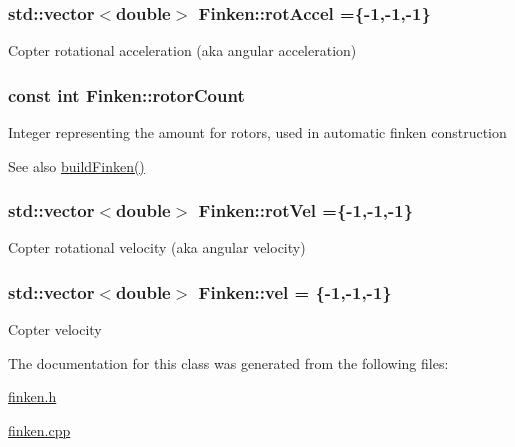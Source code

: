 \subsubsection[{\texorpdfstring{rot\+Accel}{rotAccel}}]{\setlength{\rightskip}{0pt plus 5cm}std\+::vector$<$double$>$ Finken\+::rot\+Accel =\{-\/1,-\/1,-\/1\}}\hypertarget{classFinken_ab1b738a1b691879be240b1b9488f7009}{}\label{classFinken_ab1b738a1b691879be240b1b9488f7009}
Copter rotational acceleration (aka angular acceleration) 
\subsubsection[{\texorpdfstring{rotor\+Count}{rotorCount}}]{\setlength{\rightskip}{0pt plus 5cm}const int Finken\+::rotor\+Count}\hypertarget{classFinken_a2de6be70e0baaf63641df0214bf1f7a2}{}\label{classFinken_a2de6be70e0baaf63641df0214bf1f7a2}
Integer representing the amount for rotors, used in automatic finken construction \begin{DoxySeeAlso}{See also}
\hyperlink{finken_8cpp_ab8920c514423348469521fe0063534c4}{build\+Finken()} 
\end{DoxySeeAlso}
\subsubsection[{\texorpdfstring{rot\+Vel}{rotVel}}]{\setlength{\rightskip}{0pt plus 5cm}std\+::vector$<$double$>$ Finken\+::rot\+Vel =\{-\/1,-\/1,-\/1\}}\hypertarget{classFinken_a518ab8ab8ac8cf54c0b79cbc1ec2075f}{}\label{classFinken_a518ab8ab8ac8cf54c0b79cbc1ec2075f}
Copter rotational velocity (aka angular velocity) 
\subsubsection[{\texorpdfstring{vel}{vel}}]{\setlength{\rightskip}{0pt plus 5cm}std\+::vector$<$double$>$ Finken\+::vel = \{-\/1,-\/1,-\/1\}}\hypertarget{classFinken_a4dd260e6384e7cfb8040bd53fe1c2d62}{}\label{classFinken_a4dd260e6384e7cfb8040bd53fe1c2d62}
Copter velocity 

The documentation for this class was generated from the following files\+:\begin{DoxyCompactItemize}
\item 
\hyperlink{finken_8h}{finken.\+h}\item 
\hyperlink{finken_8cpp}{finken.\+cpp}\end{DoxyCompactItemize}

